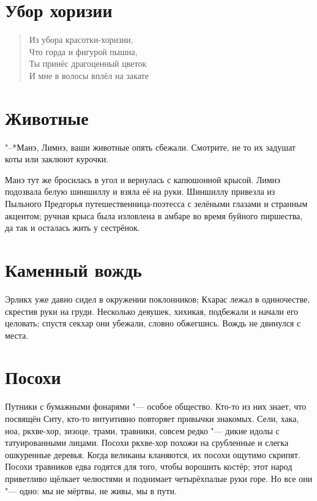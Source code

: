 \documentclass[a4paper,10pt]{book}
\newcommand{\ldotst}{\so{...}\xspace}
\begin{document}
 \section{Убор хоризии}
 
\begin{verse}
Из убора красотки-хоризии,\\
Что горда и фигурой пышна,\\
Ты принёс драгоценный цветок\\
И мне в волосы вплёл на закате\ldotst
\end{verse}

 \section{Животные}
 
 "--*Манэ, Лимнэ, ваши животные опять сбежали. Смотрите, не то их задушат коты или заклюют курочки.
 
 Манэ тут же бросилась в угол и вернулась с капюшонной крысой. Лимнэ подозвала белую шиншиллу и взяла её на руки.
 Шиншиллу привезла из Пыльного Предгорья путешественница-поэтесса с зелёными глазами и странным акцентом; ручная крыса была изловлена в амбаре во время буйного пиршества, да так и осталась жить у сестрёнок.
 
 \section{Каменный вождь}

 Эрликх уже давно сидел в окружении поклонников; Кхарас лежал в одиночестве, скрестив руки на груди. Несколько девушек, хихикая, подбежали и начали его целовать; спустя секхар они убежали, словно обжегшись. Вождь не двинулся с места.
 
 \section{Посохи}

 
 Путники с бумажными фонарями "--- особое общество. Кто-то из них знает, что посвящён Ситу, кто-то интуитивно повторяет привычки знакомых. Сели, хака, ноа, ркхве-хор, зизоце, трами, травники, совсем редко "--- дикие идолы с татуированными лицами. Посохи ркхве-хор похожи на срубленные и слегка ошкуренные деревья. Когда великаны кланяются, их посохи ощутимо скрипят. Посохи травников едва годятся для того, чтобы ворошить костёр; этот народ приветливо щёлкает челюстями и поднимает четырёхпалые руки горе. Но все они "--- одно: мы не мёртвы, не живы, мы в пути.
\end{document}
